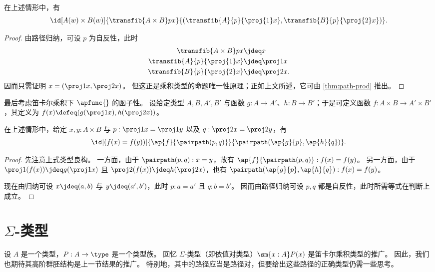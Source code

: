 \begin{thm}\label{thm:trans-prod}
  在上述情形中，有
  \[
  \id[A(w) \times B(w)]
  {\transfib{A\times B}px}
  {(\transfib{A}{p}{\proj{1}x}, \transfib{B}{p}{\proj{2}x})}.
  \]
\end{thm}
\begin{proof}
  由路径归纳，可设 $p$ 为自反性，此时
  \begin{align*}
    \transfib{A\times B}px&\jdeq x\\
    \transfib{A}{p}{\proj{1}x}&\jdeq \proj1x\\
    \transfib{B}{p}{\proj{2}x}&\jdeq \proj2x.
  \end{align*}
  因而只需证明 $x = (\proj1 x, \proj2x)$。
  但这正是乘积类型的命题唯一性原理；正如上文所述，它可由 \cref{thm:path-prod} 推出。
\end{proof}

最后考虑笛卡尔乘积下 $\apfunc{}$ 的函子性。
设给定类型 $A,B,A',B'$ 与函数 $g:A\to A'$、$h:B\to B'$；于是可定义函数 $f:A\times B\to A'\times B'$，其定义为 $f(x) \defeq (g(\proj1x),h(\proj2x))$。

\begin{thm}\label{thm:ap-prod}
  在上述情形中，给定 $x,y:A\times B$ 与 $p:\proj1x=\proj1y$ 以及 $q:\proj2x=\proj2y$，有
  \[ \id[(f(x)=f(y))]{\ap{f}{\pairpath(p,q)}} {\pairpath(\ap{g}{p},\ap{h}{q})}. \]
\end{thm}
\begin{proof}
  先注意上式类型良构。
  一方面，由于 $\pairpath(p,q):x=y$，故有 $\ap{f}{\pairpath(p,q)}:f(x)=f(y)$。
  另一方面，由于 $\proj1(f(x))\jdeq g(\proj1x)$ 且 $\proj2(f(x))\jdeq h(\proj2x)$，也有 $\pairpath(\ap{g}{p},\ap{h}{q}):f(x)=f(y)$。

  现在由归纳可设 $x\jdeq(a,b)$ 与 $y\jdeq(a',b')$，此时 $p:a=a'$ 且 $q:b=b'$。
  因而由路径归纳可设 $p,q$ 都是自反性，此时所需等式在判断上成立。
\end{proof}

%

\section{\texorpdfstring{$\Sigma$}{Σ}-类型}
\label{sec:compute-sigma}

%
设 $A$ 是一个类型，$P:A\to\type$ 是一个类型族。
回忆 $\Sigma$-类型（即依值对类型）$\sm{x:A} P(x)$ 是笛卡尔乘积类型的推广。
因此，我们也期待其高阶群胚结构是上一节结果的推广。
特别地，其中的路径应当是路径对，但要给出这些路径的正确类型仍需一些思考。

